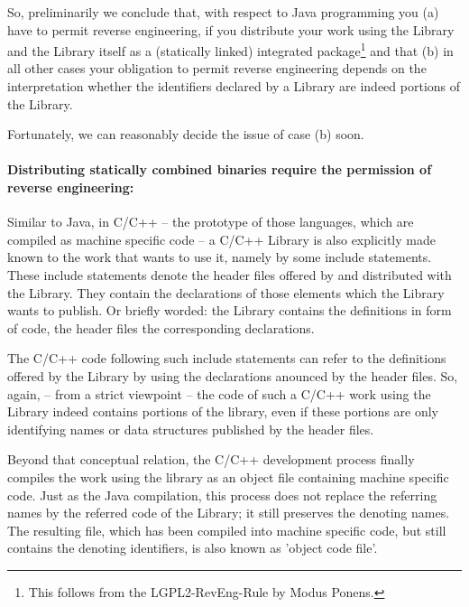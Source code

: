 So, preliminarily we conclude that, with respect to Java programming you (a)
have to permit reverse engineering, if you distribute your work using the
Library and the Library itself as a (statically linked) integrated
package\footnote{This follows from the LGPL2-RevEng-Rule by Modus Ponens.} and
that (b) in all other cases your obligation to permit reverse engineering
depends on the interpretation whether the identifiers declared by a Library are
indeed portions of the Library.

Fortunately, we can reasonably decide the issue of case (b) soon.

\paragraph{Distributing statically combined binaries require the
permission of reverse engineering:}
\label{RevEngDistributeStaticallyLinkedBinaries}
Similar to Java, in C/C++ -- the prototype of those languages, which are
compiled as machine specific code -- a C/C++ Library is also explicitly made
known to the work that wants to use it, namely by some include statements. These
include statements denote the header files offered by and distributed with the
Library. They contain the declarations of those elements which the Library wants
to publish. Or briefly worded: the Library contains the definitions in form of
code, the header files the corresponding declarations.

The C/C++ code following such include statements can refer to the definitions
offered by the Library by using the declarations anounced by the header files.
So, again, -- from a strict viewpoint -- the code of such a C/C++ work using the
Library indeed contains portions of the library, even if these portions are only
identifying names or data structures published by the header files.

Beyond that conceptual relation, the C/C++ development process finally compiles
the work using the library as an object file containing machine specific code.
Just as the Java compilation, this process does not replace the referring
names by the referred code of the Library; it still preserves the denoting
names. The resulting file, which has been compiled into machine specific code,
but still contains the denoting identifiers, is also known as 'object code
file'.

